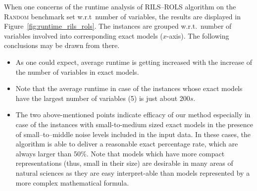 \documentclass[a4paper,12pt]{elsarticle}
\begin{document}
When one concerns of the runtime analysis of \textsc{RILS}--\textsc{ROLS} algorithm on the \textsc{Random} benchmark set w.r.t\ number of variables, the results are displayed in Figure~\ref{fig:runtime_rils_rols}. The instances are grouped w.r.t.\ number of variables involved into corresponding exact models ($x$-axis). The following conclusions may be drawn from there.  

\begin{itemize}
	\item As one could expect, average runtime is getting increased with the increase of the number of variables in exact models. 
	\item Note that the average runtime in case of the instances whose exact models have the largest number of variables (5) is just about 200$s$.
	\item The two above-mentioned points indicate efficacy of our method especially in case of the instances with small-to-medium sized exact models in the presence of small--to--middle noise levels included in the input data. In these cases, the algorithm is able to deliver a reasonable exact percentage rate, which are always larger than 50\%. Note that models which have more compact representations (thus, small in their size) are desirable in many areas of natural sciences as they are easy interpret-able than models represented by a more complex mathematical formula.   
\end{itemize}
\end{document}
